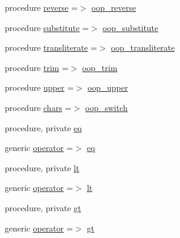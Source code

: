 \begin{DoxyCompactItemize}
\item 
procedure \mbox{\hyperlink{structm__strings__oop_1_1string_ade477c0a36f2bacaebec6dc80392b08e}{reverse}} =$>$ \mbox{\hyperlink{namespacem__strings__oop_ac3ab62e14d0b8445f51e084b810e2f76}{oop\+\_\+reverse}}
\item 
procedure \mbox{\hyperlink{structm__strings__oop_1_1string_a7a3a6f46b385a965daac8aad22d1e84f}{substitute}} =$>$ \mbox{\hyperlink{namespacem__strings__oop_af653c84bbd0165d1d4a3b61efe0472e8}{oop\+\_\+substitute}}
\item 
procedure \mbox{\hyperlink{structm__strings__oop_1_1string_a173ad4fc8d1678de6bb296c1c41eaf1f}{transliterate}} =$>$ \mbox{\hyperlink{namespacem__strings__oop_ac88f27671dd1129023494bf2500ca7fd}{oop\+\_\+transliterate}}
\item 
procedure \mbox{\hyperlink{structm__strings__oop_1_1string_a761cabaa770f1eb3311e9ceedeac4a24}{trim}} =$>$ \mbox{\hyperlink{namespacem__strings__oop_ab9238801d6c3af2fe7ee81c8d2c514ff}{oop\+\_\+trim}}
\item 
procedure \mbox{\hyperlink{structm__strings__oop_1_1string_ac4852f9fcb37135cfb6d368cc6cef2fe}{upper}} =$>$ \mbox{\hyperlink{namespacem__strings__oop_a9f4030a1ab2c7e2aa71b9d1f2754e67e}{oop\+\_\+upper}}
\item 
procedure \mbox{\hyperlink{structm__strings__oop_1_1string_a84c1d60eaee6e6acc2dbee4bce6d64bb}{chars}} =$>$ \mbox{\hyperlink{namespacem__strings__oop_a31be80e67fa4829b5ac48c530bd58b7b}{oop\+\_\+switch}}
\item 
procedure, private \mbox{\hyperlink{structm__strings__oop_1_1string_a18b563c23c8c5eef4afdb2f5abbd4dea}{eq}}
\item 
generic \mbox{\hyperlink{structm__strings__oop_1_1string_ade49da8d352a6c0d69f5719a5a056d60}{operator}} =$>$ \mbox{\hyperlink{structm__strings__oop_1_1string_a18b563c23c8c5eef4afdb2f5abbd4dea}{eq}}
\item 
procedure, private \mbox{\hyperlink{structm__strings__oop_1_1string_aa76a0bd5d16d7c9e2d35055495ee59e6}{lt}}
\item 
generic \mbox{\hyperlink{structm__strings__oop_1_1string_a22c104099ad26ca065d7e0ddbfca7aeb}{operator}} =$>$ \mbox{\hyperlink{structm__strings__oop_1_1string_aa76a0bd5d16d7c9e2d35055495ee59e6}{lt}}
\item 
procedure, private \mbox{\hyperlink{structm__strings__oop_1_1string_ad32f6920070952a482fe9c771bd24ade}{gt}}
\item 
generic \mbox{\hyperlink{structm__strings__oop_1_1string_ae1b6295dd1d93cf270435c91fa29ce01}{operator}} =$>$ \mbox{\hyperlink{structm__strings__oop_1_1string_ad32f6920070952a482fe9c771bd24ade}{gt}}

\end{DoxyCompactItemize}
